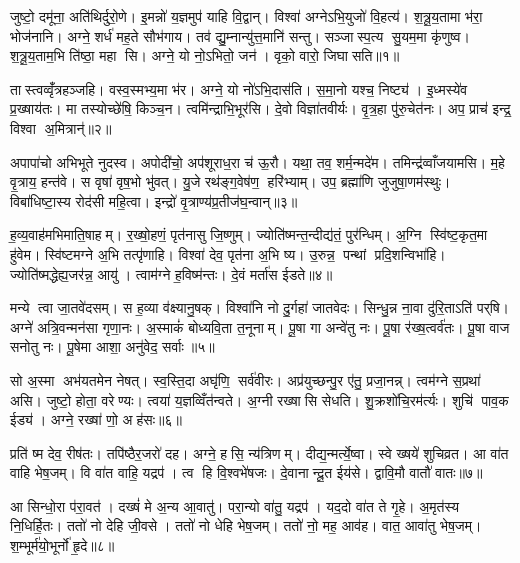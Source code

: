 \clearpage
{}
\setcounter{anuvakam}{0}
जुष्टो॒ दमू॑ना॒ अति॑थिर्दुरो॒णे। इ॒मन्नो॑ य॒ज्ञमुप॑ याहि वि॒द्वान्। विश्वा॑ अग्नेऽभि॒युजो॑ वि॒हत्य॑। श॒त्रू॒य॒तामा भ॑रा॒ भोज॑नानि। अग्ने॒ शर्ध॑ मह॒ते सौभ॑गाय। तव॑ द्यु॒म्नान्यु॑त्त॒मानि॑ सन्तु। सञ्जास्प॒त्य सु॒यम॒मा कृ॑णुष्व। श॒त्रू॒य॒ताम॒भि ति॑ष्ठा॒ महा सि। अग्ने॒ यो नो॒ऽभितो॒ जन॑। वृको॒ वारो॒ जिघासति॥१॥

तास्त्वव्वृँ॑त्रहञ्जहि। वस्व॒स्मभ्य॒मा भ॑र। अग्ने॒ यो नो॑ऽभि॒दास॑ति। स॒मा॒नो यश्च॒ निष्ट्य॑। इ॒ध्मस्ये॑व प्र॒ख्षाय॑तः। मा तस्योच्छे॑षि॒ किञ्च॒न। त्वमि॑न्द्राभि॒भूर॑सि। दे॒वो विज्ञा॑तवीर्यः। वृ॒त्र॒हा पु॑रु॒चेत॑नः। अप॒ प्राच॑ इन्द्र॒ विश्वा अ॒मित्रान्॑॥२॥

अपापा॑चो अभिभूते नुदस्व। अपोदी॑चो॒ अप॑शूराध॒रा च॑ ऊ॒रौ। यथा॒ तव॒ शर्म॒न्मदे॑म। तमिन्द्र॑व्वाँजयामसि। म॒हे वृ॒त्राय॒ हन्त॑वे। स वृषा॑ वृष॒भो भु॑वत्। यु॒जे रथ॑ङ्ग॒वेष॑ण॒ हरि॑भ्याम्। उप॒ ब्रह्मा॑णि जुजुषा॒णम॑स्थुः। विबा॑धिष्टा॒स्य रोद॑सी महि॒त्वा। इन्द्रो॑ वृ॒त्राण्य॑प्र॒तीज॑घ॒न्वान्॥३॥

ह॒व्य॒वाह॑मभिमाति॒षाहम्। र॒ख्षो॒हणं॒ पृत॑नासु जि॒ष्णुम्। ज्योति॑ष्मन्त॒न्दीद्य॑तं॒ पुर॑न्धिम्। अ॒ग्नि स्वि॑ष्ट॒कृत॒मा हु॑वेम। स्वि॑ष्टमग्ने अ॒भि तत्पृ॑णाहि। विश्वा॑ देव॒ पृत॑ना अ॒भि ष्य। उ॒रुन्न॒ पन्थां प्रदि॒शन्विभा॑हि। ज्योति॑ष्मद्धेह्य॒जर॑न्न॒ आयु॑। त्वाम॑ग्ने ह॒विष्म॑न्तः। दे॒वं मर्ता॑स ईडते॥४॥

मन्ये त्वा जा॒तवे॑दसम्। स ह॒व्या व॑क्ष्यानु॒षक्। विश्वा॑नि नो दु॒र्गहा॑ जातवेदः। सिन्धु॒न्न ना॒वा दु॑रि॒ताऽति॑ पर्‌षि। अग्ने॑ अत्रि॒वन्मन॑सा गृणा॒नः। अ॒स्माकं॑ बोध्यवि॒ता त॒नूनाम्। पू॒षा गा अन्वे॑तु नः। पू॒षा र॑ख्ष॒त्वर्व॑तः। पू॒षा वाज सनोतु नः। पू॒षेमा आशा॒ अनु॑वेद॒ सर्वाः॥५॥

सो अ॒स्मा अभ॑यतमेन नेषत्। स्व॒स्ति॒दा अघृ॑णि॒ सर्व॑वीरः। अप्र॑युच्छन्पु॒र ए॑तु॒ प्रजा॒नन्न्। त्वम॑ग्ने स॒प्रथा॑ असि। जुष्टो॒ होता॒ वरेण्यः। त्वया॑ य॒ज्ञव्विँत॑न्वते। अ॒ग्नी रख्षासि सेधति। शु॒क्रशो॑चि॒रम॑र्त्यः। शुचि॑ पाव॒क ईड्य॑। अग्ने॒ रख्षा॑ णो॒ अह॑सः॥६॥

प्रति॑ ष्म देव॒ रीष॑तः। तपि॑ष्ठैर॒जरो॑ दह। अग्ने॒ हसि॒ न्य॑त्रिणम्। दीद्य॒न्मर्त्ये॒ष्वा। स्वे ख्षये॑ शुचिव्रत। आ वा॑त वाहि भेष॒जम्। वि वा॑त वाहि॒ यद्रप॑। त्व हि वि॒श्वभे॑षजः। दे॒वानान्दू॒त ईय॑से। द्वावि॒मौ वातौ॑ वातः॥७॥

आ सिन्धो॒रा प॑रा॒वत॑। दख्षं॑ मे अ॒न्य आ॒वातु॑। परा॒न्यो वा॑तु॒ यद्रप॑। यद॒दो वा॑त ते गृ॒हे। अ॒मृत॑स्य नि॒धिर्\mbox{}हि॒तः। ततो॑ नो देहि जी॒वसे। ततो॑ नो धेहि भेष॒जम्। ततो॑ नो॒ मह॒ आव॑ह। वात॒ आवा॑तु भेष॒जम्। श॒म्भूर्म॑यो॒भूर्नो॑ हृ॒दे॥८॥

